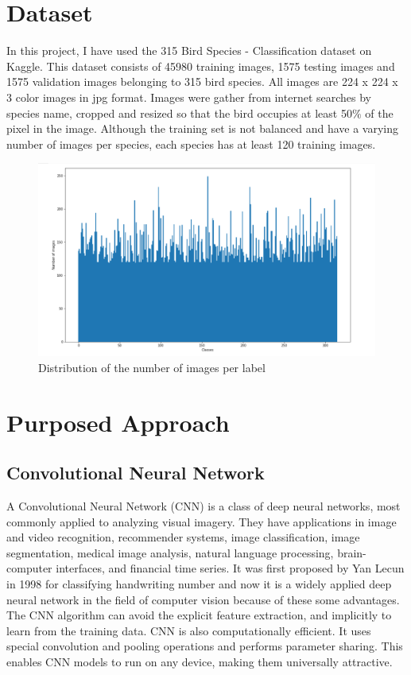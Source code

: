 \documentclass[runningheads]{llncs}
\begin{document}
\section{Dataset}
In this project, I have used the 315 Bird Species - Classification dataset on Kaggle. This dataset consists of 45980 training images, 1575 testing images and 1575 validation images belonging to 315 bird species. All images are 224 x 224 x 3 color images in jpg format. Images were gather from internet searches by species name, cropped and resized so that the bird occupies at least 50$\%$ of the pixel in the image. Although the training set is not balanced and have a varying number of images per species, each species has at least 120 training images. 
\begin{figure}
    \centering
    \includegraphics[width=\textwidth]{Figures/dataset distribution.png}
    \caption{Distribution of the number of images per label}
    \label{fig:ds_distribution}
\end{figure}

\section{Purposed Approach}
\subsection{Convolutional Neural Network}
A Convolutional Neural Network (CNN) is a class of deep neural networks, most commonly applied to analyzing visual imagery. They have applications in image and video recognition, recommender systems, image classification, image segmentation, medical image analysis, natural language processing, brain-computer interfaces, and financial time series\cite{cnn_intro}. It was first proposed by Yan Lecun in 1998 for classifying handwriting number and now it is a widely applied deep neural network in the field of computer vision because of these some advantages. The CNN algorithm can avoid the explicit feature extraction, and implicitly to learn from the training data. CNN is also computationally efficient. It uses special convolution and pooling operations and performs parameter sharing. This enables CNN models to run on any device, making them universally attractive\cite{cnn_advan}.
\end{document}
